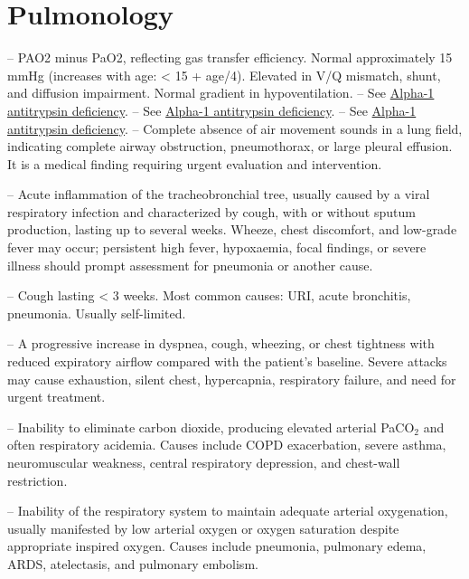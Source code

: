 \chapter{Pulmonology}

-- PAO2 minus PaO2, reflecting gas transfer efficiency. Normal approximately 15 mmHg (increases with age: < 15 + age/4). Elevated in V/Q mismatch, shunt, and diffusion impairment. Normal gradient in hypoventilation.
-- See \hyperlink{Alpha-1 Antitrypsin Deficiency}{Alpha-1 antitrypsin deficiency}.
-- See \hyperlink{Alpha-1 Antitrypsin Deficiency}{Alpha-1 antitrypsin deficiency}.
-- See \hyperlink{Alpha-1 Antitrypsin Deficiency}{Alpha-1 antitrypsin deficiency}.
-- Complete absence of air movement sounds in a lung field, indicating complete airway obstruction, pneumothorax, or large pleural effusion. It is a medical finding requiring urgent evaluation and intervention.

-- Acute inflammation of the tracheobronchial tree, usually caused by a viral respiratory infection and characterized by cough, with or without sputum production, lasting up to several weeks. Wheeze, chest discomfort, and low-grade fever may occur; persistent high fever, hypoxaemia, focal findings, or severe illness should prompt assessment for pneumonia or another cause.

-- Cough lasting < 3 weeks. Most common causes: URI, acute bronchitis, pneumonia. Usually self-limited.

-- A progressive increase in dyspnea, cough, wheezing, or chest tightness with reduced expiratory airflow compared with the patient’s baseline. Severe attacks may cause exhaustion, silent chest, hypercapnia, respiratory failure, and need for urgent treatment.

-- Inability to eliminate carbon dioxide, producing elevated arterial PaCO$_2$ and often respiratory acidemia. Causes include COPD exacerbation, severe asthma, neuromuscular weakness, central respiratory depression, and chest-wall restriction.

-- Inability of the respiratory system to maintain adequate arterial oxygenation, usually manifested by low arterial oxygen or oxygen saturation despite appropriate inspired oxygen. Causes include pneumonia, pulmonary edema, ARDS, atelectasis, and pulmonary embolism.

